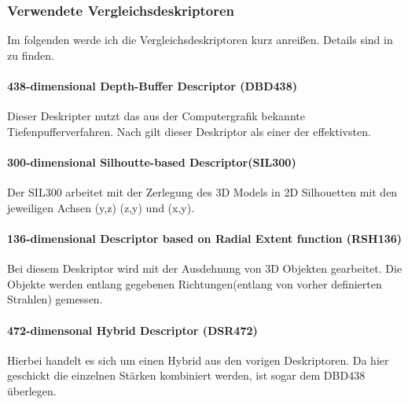 
\subsubsection{Verwendete Vergleichsdeskriptoren}
Im folgenden werde ich die Vergleichsdeskriptoren kurz anreißen. Details sind in \cite{dvvra3DModelret} zu finden.

\paragraph{438-dimensional Depth-Buffer Descriptor (DBD438)}
Dieser Deskripter nutzt das aus der Computergrafik bekannte Tiefenpufferverfahren. Nach \cite{scherer2010histograms} gilt dieser Deskriptor als einer der effektivsten.

\paragraph{300-dimensional Silhoutte-based Descriptor(SIL300)}
Der SIL300 arbeitet mit der Zerlegung des 3D Models in 2D Silhouetten 
mit den jeweiligen Achsen (y,z) (z,y) und (x,y).

\paragraph{136-dimensional Descriptor based on Radial Extent function (RSH136) }
Bei diesem Deskriptor wird mit der Ausdehnung von 3D Objekten gearbeitet. Die Objekte werden entlang gegebenen Richtungen(entlang von vorher definierten Strahlen) gemessen.

\paragraph{472-dimensonal Hybrid Descriptor (DSR472) }
Hierbei handelt es sich um einen Hybrid aus den vorigen Deskriptoren. Da hier geschickt die einzelnen Stärken kombiniert werden, ist sogar dem DBD438 überlegen.

